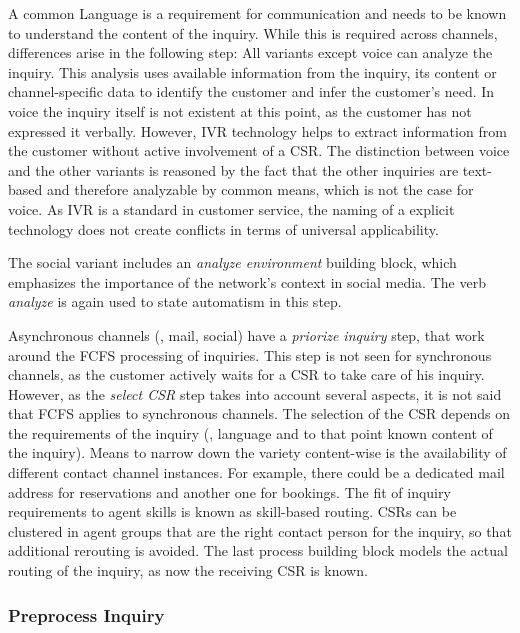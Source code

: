 A common Language is a requirement for communication and needs to be known to understand the content of the inquiry. While this is required across channels, differences arise in the following step: All variants except voice can analyze the inquiry. This analysis uses available information from the inquiry, \ie its content or channel-specific data to identify the customer and infer the customer's need. In voice the inquiry itself is not existent at this point, as the customer has not expressed it verbally. However, \acrfull{IVR} technology helps to extract information from the customer without active involvement of a \acrshort{CSR}. The distinction between voice and the other variants is reasoned by the fact that the other inquiries are text-based and therefore analyzable by common means, which is not the case for voice. As \acrshort{IVR} is a standard in customer service, the naming of a explicit technology does not create conflicts in terms of universal applicability.

The social variant includes an \textit{analyze environment} building block, which emphasizes the importance of the network's context in social media. The verb \textit{analyze} is again used to state automatism in this step. 

Asynchronous channels (\ie, mail, social) have a \textit{priorize inquiry} step, that work around the \acrshort{FCFS} processing of inquiries. This step is not seen for synchronous channels, as the customer actively waits for a \acrshort{CSR} to take care of his inquiry. However, as the \textit{select  \acrshort{CSR}} step takes into account several aspects, it is not said that \acrshort{FCFS} applies to synchronous channels. The selection of the  \acrshort{CSR} depends on the requirements of the inquiry (\ie, language and to that point known content of the inquiry). Means to narrow down the variety content-wise is the availability of different contact channel instances. For example, there could be a dedicated mail address for reservations and another one for bookings. The fit of inquiry requirements to agent skills is known as skill-based routing. \acrshort{CSR}s can be clustered in agent groups that are the right contact person for the inquiry, so that additional rerouting is avoided. The last process building block models the actual routing of the inquiry, as now the receiving  \acrshort{CSR} is known.


\subsubsection{Preprocess Inquiry}

